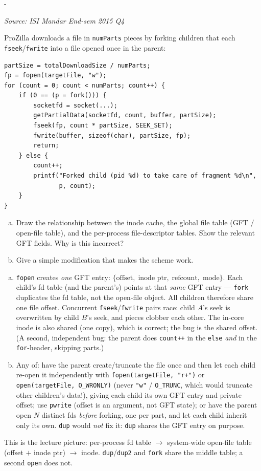 \documentclass[11pt,a4paper]{article}
\makeatletter
\newcommand{\keepspace}[1]{\par\penalty-100\begingroup
  \setlength{\dimen@}{#1}\dimen@ii\pagegoal\advance\dimen@ii-\pagetotal
  \ifdim\dimen@>\dimen@ii\ifdim\dimen@ii>\z@\vfil\fi\break\fi\endgroup}
\newcounter{qn}[section]
\newenvironment{Qn}[4]{%
  \refstepcounter{qn}\keepspace{7\baselineskip}%
  \begin{tcolorbox}[qboxstyle, title={Q\thesection.\theqn\ \ [#1 \textbar\ #2]\ \ #4}]%
  {\footnotesize\color{g3}\textit{Source: #3}}\par\smallskip%
}{%
  \end{tcolorbox}%
}
\newenvironment{Sol}{%
  \begin{tcolorbox}[sboxstyle, title={Solution}]%
}{%
  \end{tcolorbox}\vspace{0.35em}%
}
\makeatother
\begin{document}
\begin{Qn}{Hard}{Lect 23}{ISI Mandar End-sem 2015 Q4}{ProZilla: \texttt{fork} shares the GFT offset}
ProZilla downloads a file in \texttt{numParts} pieces by forking children
that each \texttt{fseek}/\texttt{fwrite} into a file opened once in the
parent:
\begin{lstlisting}[numbers=none]
partSize = totalDownloadSize / numParts;
fp = fopen(targetFile, "w");
for (count = 0; count < numParts; count++) {
    if (0 == (p = fork())) {
        socketfd = socket(...);
        getPartialData(socketfd, count, buffer, partSize);
        fseek(fp, count * partSize, SEEK_SET);
        fwrite(buffer, sizeof(char), partSize, fp);
        return;
    } else {
        count++;
        printf("Forked child (pid %d) to take care of fragment %d\n",
               p, count);
    }
}
\end{lstlisting}
\begin{enumerate}[(a)]
\item Draw the relationship between the inode cache, the global file
      table (GFT / open-file table), and the per-process file-descriptor
      tables. Show the relevant GFT fields. Why is this incorrect?
\item Give a simple modification that makes the scheme work.
\end{enumerate}
\end{Qn}
\begin{Sol}
\begin{enumerate}[(a)]
\item \texttt{fopen} creates \emph{one} GFT entry:
      $\{\text{offset},\;\text{inode ptr},\;\text{refcount},\;\text{mode}\}$.
      Each child's fd table (and the parent's) points at that \emph{same}
      GFT entry --- \texttt{fork} duplicates the fd table, not the
      open-file object. All children therefore share one file offset.
      Concurrent \texttt{fseek}/\texttt{fwrite} pairs race: child $A$'s
      seek is overwritten by child $B$'s seek, and pieces clobber each
      other. The in-core inode is also shared (one copy), which is
      correct; the bug is the shared offset.
      (A second, independent bug: the parent does \texttt{count++} in
      the \texttt{else} \emph{and} in the \texttt{for}-header, skipping
      parts.)
\item Any of: have the parent create/truncate the file once and then
      let each child re-open it independently with
      \texttt{fopen(targetFile, "r+")} or
      \texttt{open(targetFile, O\_WRONLY)} (never \texttt{"w"} /
      \texttt{O\_TRUNC}, which would truncate other children's data!),
      giving each child its own GFT entry and private offset; use
      \texttt{pwrite} (offset is an argument, not GFT state); or have
      the parent open $N$ distinct fds \emph{before} forking, one per
      part, and let each child inherit only its own. \texttt{dup} would
      \emph{not} fix it: \texttt{dup} shares the GFT entry on purpose.
\end{enumerate}
This is the lecture picture: per-process fd table $\to$ system-wide
open-file table (offset $+$ inode ptr) $\to$ inode.
\texttt{dup}/\texttt{dup2} and \texttt{fork} share the middle table;
a second \texttt{open} does not.
\end{Sol}
\end{document}

